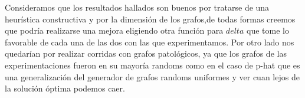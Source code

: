 Consideramos que los resultados hallados son buenos por tratarse de una heurística constructiva y por la dimensión de los grafos,de todas formas creemos que podría realizarse una mejora eligiendo otra función para $delta$ que tome lo favorable de cada una de las dos con las que experimentamos. 
Por otro lado nos quedarían por realizar corridas con grafos patológicos, ya que los grafos de las experimentaciones fueron en su mayoría randoms como en el caso de p-hat que es una generalización del generador de grafos randoms uniformes y ver cuan lejos de la solución óptima podemos caer. 
